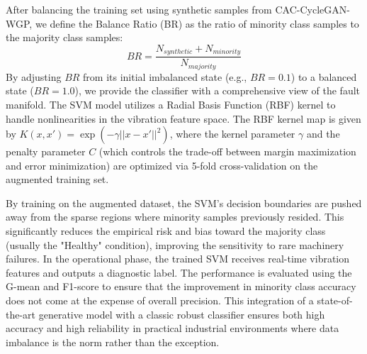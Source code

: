 After balancing the training set using synthetic samples from CAC-CycleGAN-WGP, we define the Balance Ratio (BR) as the ratio of minority class samples to the majority class samples:
\begin{equation}
BR = \frac{N_{synthetic} + N_{minority}}{N_{majority}}
\end{equation}
By adjusting $BR$ from its initial imbalanced state (e.g., $BR=0.1$) to a balanced state ($BR=1.0$), we provide the classifier with a comprehensive view of the fault manifold. The SVM model utilizes a Radial Basis Function (RBF) kernel to handle nonlinearities in the vibration feature space. The RBF kernel map is given by $K(x, x') = \exp(-\gamma ||x - x'||^2)$, where the kernel parameter $\gamma$ and the penalty parameter $C$ (which controls the trade-off between margin maximization and error minimization) are optimized via 5-fold cross-validation on the augmented training set. 

By training on the augmented dataset, the SVM's decision boundaries are pushed away from the sparse regions where minority samples previously resided. This significantly reduces the empirical risk and bias toward the majority class (usually the "Healthy" condition), improving the sensitivity to rare machinery failures. In the operational phase, the trained SVM receives real-time vibration features and outputs a diagnostic label. The performance is evaluated using the G-mean and F1-score to ensure that the improvement in minority class accuracy does not come at the expense of overall precision. This integration of a state-of-the-art generative model with a classic robust classifier ensures both high accuracy and high reliability in practical industrial environments where data imbalance is the norm rather than the exception.

